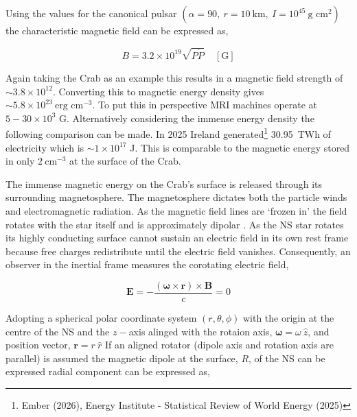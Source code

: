 Using the values for the canonical pulsar $(\alpha =90, ~r=10~\text{km}, ~I=10^{45}~\text{g cm}^2)$ the characteristic magnetic field can be expressed as, 

\begin{equation}
    B = 3.2\times 10^{19} \sqrt{P \dot P} ~~~~~\mathrm{[G]}
\end{equation}

Again taking the Crab as an example this results in a magnetic field strength of $\sim3.8\times10^{12}$. Converting this to magnetic energy density gives $\sim 5.8 \times 10^{23}~\text{erg cm}^{-3}$. To put this in perspective MRI machines operate at $5-30\times 10^3$ G. Alternatively considering the immense energy density the following comparison can be made. In 2025 Ireland generated\footnote{Ember (2026), Energy Institute - Statistical Review of World Energy (2025)} 30.95~TWh of electricity which is $\sim 1 \times 10^{17}$ J. This is comparable to the magnetic energy stored in only $2 ~\text{cm}^{-3}$ at the surface of the Crab. 

The immense magnetic energy on the Crab's surface is released through its surrounding magnetosphere. The magnetosphere dictates both the particle winds and electromagnetic radiation. As the magnetic field lines are `frozen in' the field rotates with the star itself and is approximately dipolar \citep{goldreich_pulsar_1969}. 
As the NS star rotates its highly conducting surface cannot sustain an electric field in its own rest frame because free charges redistribute until the electric field vanishes. Consequently, an observer in the inertial frame measures the corotating electric field,



\begin{equation}
    \mathbf{E} = -\frac{(\mathbf{{\boldsymbol{\omega}} \times r}) \times \mathbf{B}}{c}=0
    \label{eq:ideal_conductor_IF}
\end{equation}


Adopting a spherical polar coordinate system $(r, \theta, \phi)$ with the origin at the centre of the NS and the $z-$axis alinged with the rotaion axis, $\boldsymbol{\omega} = \omega ~ \hat z$, and position vector, $\boldsymbol{r} = r ~ \hat r$
If an aligned rotator (dipole axis and rotation axis are parallel) is assumed the magnetic dipole at the surface, $R$, of the NS can be expressed radial component can be expressed as, 

